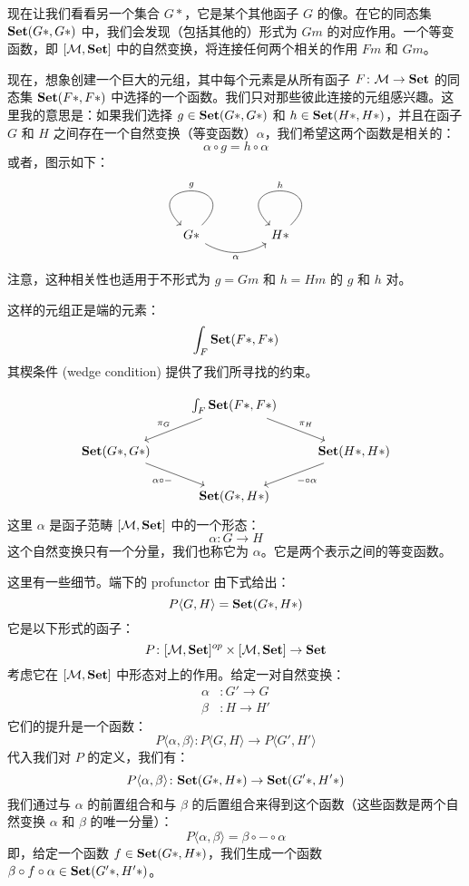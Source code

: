 \documentclass[DaoFP]{subfiles}
\begin{document}
 现在让我们看看另一个集合 $G *$，它是某个其他函子 $G$ 的像。在它的同态集 $\mathbf{Set}(G *, G *)$ 中，我们会发现（包括其他的）形式为 $G m$ 的对应作用。一个等变函数，即 $[\mathcal{M}, \mathbf{Set}]$ 中的自然变换，将连接任何两个相关的作用 $F m$ 和 $G m$。

 现在，想象创建一个巨大的元组，其中每个元素是从所有函子 $F\colon \mathcal{M} \to \mathbf{Set}$ 的同态集 $\mathbf{Set} (F *, F *)$ 中选择的一个函数。我们只对那些彼此连接的元组感兴趣。这里我的意思是：如果我们选择 $g \in  \mathbf{Set} (G*, G *)$ 和  $h \in  \mathbf{Set} (H*,  H*)$，并且在函子 $G$ 和 $H$ 之间存在一个自然变换（等变函数）$\alpha$，我们希望这两个函数是相关的：
 \[ \alpha \circ g = h \circ \alpha \]
 或者，图示如下：
 \[
  \begin{tikzcd}
   G *
   \arrow[loop, "g"']
   \arrow[rr, bend right, "\alpha"']
   && H *
   \arrow[loop, "h"']
  \end{tikzcd}
 \]
 注意，这种相关性也适用于不形式为 $g = G m$ 和 $h=H m$ 的 $g$ 和 $h$ 对。

 这样的元组正是端的元素：
 \[ \int_F \mathbf{Set}(F *, F *) \]
 其楔条件 (wedge condition) 提供了我们所寻找的约束。

 \[
  \begin{tikzcd}
   & \int_F \Set (F *, F *)
   \arrow[dl, "\pi_G"']
   \arrow[dr, "\pi_H"]
   \\
   \Set(G *, G *)
   \arrow[dr, "\alpha \circ -"']
   && \Set (H *, H *)
   \arrow[dl, "- \circ \alpha"]
   \\
   & \Set (G *, H *)
  \end{tikzcd}
 \]
 这里 $\alpha$ 是函子范畴 $[\mathcal{M}, \mathbf{Set} ]$ 中的一个形态：
 \[ \alpha \colon G \to H \]
 这个自然变换只有一个分量，我们也称它为 $\alpha$。它是两个表示之间的等变函数。

 这里有一些细节。端下的 profunctor 由下式给出：
 \[ P \langle G, H \rangle = \mathbf{Set} (G *, H *) \]
 它是以下形式的函子：
 \[ P \colon [\mathcal{M}, \mathbf{Set}]^{op} \times [\mathcal{M}, \mathbf{Set}] \to \mathbf{Set} \]
 考虑它在 $[\mathcal{M}, \mathbf{Set}]$ 中形态对上的作用。给定一对自然变换：
 \begin{align*}
  \alpha &\colon G' \to G \\
  \beta &\colon H \to H'
 \end{align*}
 它们的提升是一个函数：
 \[ P\langle \alpha, \beta \rangle \colon  P\langle G, H \rangle \to P\langle G', H' \rangle\]
 代入我们对 $P$ 的定义，我们有：
 \[ P\langle \alpha, \beta \rangle \colon  \mathbf{Set} ( G*, H*)  \to \mathbf{Set} (G'*, H'*)\]
 我们通过与 $\alpha$ 的前置组合和与 $\beta$ 的后置组合来得到这个函数（这些函数是两个自然变换 $\alpha$ 和 $\beta$ 的唯一分量）：
 \[ P \langle \alpha, \beta \rangle = \beta \circ - \circ \alpha \]
 即，给定一个函数 $f \in \mathbf{Set}(G*, H*)$，我们生成一个函数 $\beta \circ f \circ \alpha \in \mathbf{Set}(G' *, H' *)$。
\end{document}

